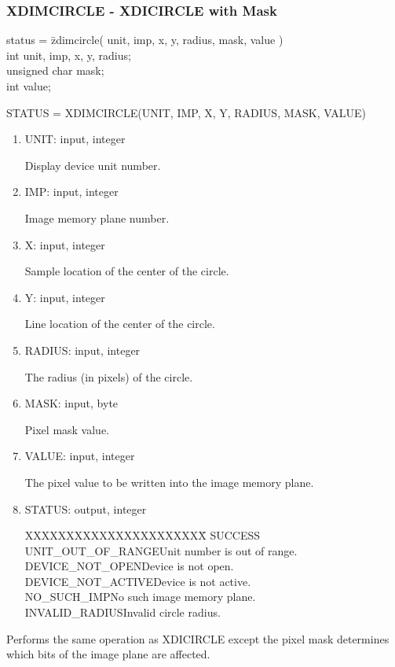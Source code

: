 \subsubsection{XDIMCIRCLE - XDICIRCLE with Mask}
\begin{tabbing}
status = \=zdimcircle( unit, imp, x, y, radius, mask, value )\\
\>int  unit, imp, x, y, radius;\\
\>unsigned char  mask;\\
\>int  value;\\
\end{tabbing}
STATUS = XDIMCIRCLE(UNIT, IMP, X, Y, RADIUS, MASK, VALUE)
\begin{enumerate}
\item UNIT:  input, integer

Display device unit number.
\item IMP:  input, integer

Image memory plane number.
\item X:  input, integer

Sample location of the center of the circle.
\item Y:  input, integer

Line location of the center of the circle.
\item RADIUS:  input, integer

The radius (in pixels) of the circle.
\item MASK:  input, byte

Pixel mask value.
\item VALUE:  input, integer

The pixel value to be written into the image memory plane.
\item STATUS:  output, integer
\begin{tabbing}
XXXXXXXXXXXXXXXXXXXXXX\=\kill
SUCCESS\\
UNIT\_OUT\_OF\_RANGE\>Unit number is out of range.\\
DEVICE\_NOT\_OPEN\>Device is not open.\\
DEVICE\_NOT\_ACTIVE\>Device is not active.\\
NO\_SUCH\_IMP\>No such image memory plane.\\
INVALID\_RADIUS\>Invalid circle radius.\\
\end{tabbing}
\end{enumerate}
Performs the same operation as XDICIRCLE except the pixel mask
determines which bits of the image plane are affected.
\newpage
